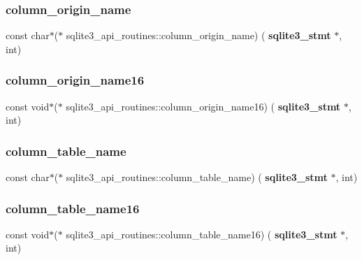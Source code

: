 \subsubsection{column\_origin\_name}
{\footnotesize\ttfamily const char$\ast$($\ast$ sqlite3\+\_\+api\+\_\+routines\+::column\+\_\+origin\+\_\+name) (\textbf{ sqlite3\+\_\+stmt} $\ast$, int)}

\mbox{\label{structsqlite3__api__routines_a29f148c32e2e8aba50d3ff3ffd8c4f90}} 
\subsubsection{column\_origin\_name16}
{\footnotesize\ttfamily const void$\ast$($\ast$ sqlite3\+\_\+api\+\_\+routines\+::column\+\_\+origin\+\_\+name16) (\textbf{ sqlite3\+\_\+stmt} $\ast$, int)}

\mbox{\label{structsqlite3__api__routines_a06525d1223f774274ff49b287d33a952}} 
\subsubsection{column\_table\_name}
{\footnotesize\ttfamily const char$\ast$($\ast$ sqlite3\+\_\+api\+\_\+routines\+::column\+\_\+table\+\_\+name) (\textbf{ sqlite3\+\_\+stmt} $\ast$, int)}

\mbox{\label{structsqlite3__api__routines_a3252c82d0f2ed7e88a76f26585d13bbb}} 
\subsubsection{column\_table\_name16}
{\footnotesize\ttfamily const void$\ast$($\ast$ sqlite3\+\_\+api\+\_\+routines\+::column\+\_\+table\+\_\+name16) (\textbf{ sqlite3\+\_\+stmt} $\ast$, int)}

\mbox{\label{structsqlite3__api__routines_ae9bb95b6e37236693ca5ec51598c7908}} 
